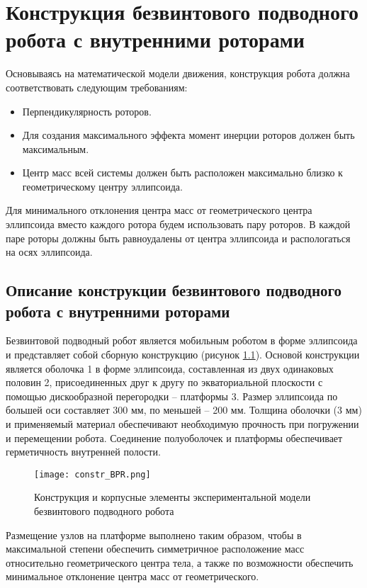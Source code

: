 \chapter{Конструкция безвинтового подводного робота с внутренними роторами}\label{ch:ch3}

Основываясь на математической модели движения, конструкция робота должна соответствовать следующим требованиям:

\begin{itemize}
	\item Перпендикулярность роторов.
	\item Для создания максимального эффекта момент инерции роторов должен быть максимальным.
	\item Центр масс всей системы должен быть расположен максимально близко к геометрическому центру эллипсоида.
\end{itemize}

Для минимального отклонения центра масс от геометрического центра эллипсоида вместо каждого ротора будем использовать пару роторов. В каждой паре роторы должны быть равноудалены от центра эллипсоида и распологаться на осях эллипсоида.

\section{Описание конструкции безвинтового подводного робота с внутренними роторами}

Безвинтовой подводный робот является мобильным роботом в форме эллипсоида и представляет собой сборную конструкцию (рисунок \ref{constr_BPR}). Основой конструкции является оболочка 1 в форме эллипсоида, составленная из двух одинаковых половин 2, присоединенных друг к другу по экваториальной плоскости с помощью дискообразной перегородки – платформы 3. Размер эллипсоида по большей оси составляет 300 мм, по меньшей – 200 мм. Толщина оболочки (3 мм) и применяемый материал обеспечивают необходимую прочность при погружении и перемещении робота. Соединение полуоболочек и платформы обеспечивает герметичность внутренней полости.

\begin{figure}[h]
	\centering
	\texttt{[image: constr\_BPR.png]}%
	\caption{Конструкция и корпусные элементы экспериментальной модели безвинтового подводного робота}
	\label{constr_BPR}
\end{figure}

Размещение узлов на платформе выполнено таким образом, чтобы в максимальной степени обеспечить симметричное расположение масс относительно геометрического центра тела, а также по возможности обеспечить минимальное отклонение центра масс от геометрического.

